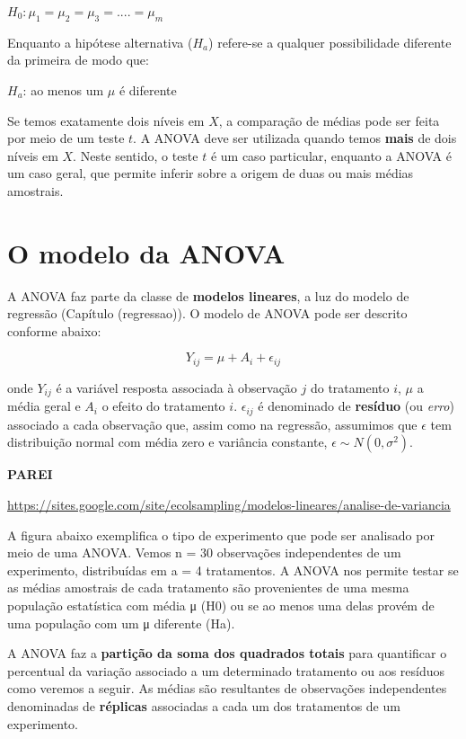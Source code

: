 \documentclass[
]{book}
\begin{document}
\(H_0: \mu_1 = \mu_2 = \mu_3 =.... = \mu_m\)

Enquanto a hipótese alternativa (\(H_a\)) refere-se a qualquer possibilidade diferente da primeira de modo que:

\(H_a\): ao menos um \(\mu\) é diferente

Se temos exatamente dois níveis em \(X\), a comparação de médias pode ser feita por meio de um teste \(t\). A ANOVA deve ser utilizada quando temos \textbf{mais} de dois níveis em \(X\). Neste sentido, o teste \(t\) é um caso particular, enquanto a ANOVA é um caso geral, que permite inferir sobre a origem de duas ou mais médias amostrais.

\hypertarget{o-modelo-da-anova}{%
\section{O modelo da ANOVA}\label{o-modelo-da-anova}}

A ANOVA faz parte da classe de \textbf{modelos lineares}, a luz do modelo de regressão (Capítulo (regressao)). O modelo de ANOVA pode ser descrito conforme abaixo:

\[Y_{ij} = \mu + A_i + \epsilon_{ij}\]

onde \(Y_{ij}\) é a variável resposta associada à observação \(j\) do tratamento \(i\), \(\mu\) a média geral e \(A_i\) o efeito do tratamento \(i\). \(\epsilon_{ij}\) é denominado de \textbf{resíduo} (ou \emph{erro}) associado a cada observação que, assim como na regressão, assumimos que \(\epsilon\) tem distribuição normal com média zero e variância constante, \(\epsilon \sim N(0, \sigma^2)\).

\textbf{PAREI}

\url{https://sites.google.com/site/ecolsampling/modelos-lineares/analise-de-variancia}

A figura abaixo exemplifica o tipo de experimento que pode ser analisado por meio de uma ANOVA. Vemos n = 30 observações independentes de um experimento, distribuídas em a = 4 tratamentos. A ANOVA nos permite testar se as médias amostrais de cada tratamento são provenientes de uma mesma população estatística com média μ (H0) ou se ao menos uma delas provém de uma população com um μ diferente (Ha).

A ANOVA faz a \textbf{partição da soma dos quadrados totais} para quantificar o percentual da variação associado a um determinado tratamento ou aos resíduos como veremos a seguir. As médias são resultantes de observações independentes denominadas de \textbf{réplicas} associadas a cada um dos tratamentos de um experimento.
\end{document}

